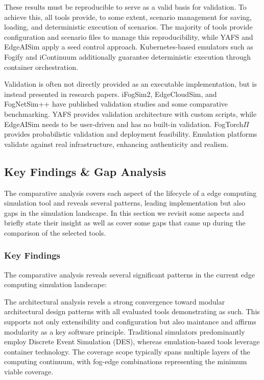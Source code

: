 These results must be reproducible to serve as a valid basis for validation.
To achieve this, all tools provide, to some extent, scenario management for saving, loading, and deterministic execution of scenarios.
The majority of tools provide configuration and scenario files to manage this reproducibility, while YAFS and EdgeAISim apply a seed control approach.
Kubernetes-based emulators such as Fogify and iContinuum additionally guarantee deterministic execution through container orchestration. 

Validation is often not directly provided as an executable implementation, but is instead presented in research papers.
iFogSim2, EdgeCloudSim, and FogNetSim++ have published validation studies and some comparative benchmarking.
YAFS provides validation architecture with custom scripts, while EdgeAISim needs to be user-driven and has no built-in validation.
FogTorch$\Pi$ provides probabilistic validation and deployment feasibility.
Emulation platforms validate against real infrastructure, enhancing authenticity and realism.

\subsection{Key Findings \& Gap Analysis}
The comparative analysis covers each aspect of the lifecycle of a edge computing simulation tool and reveals several patterns, leading implementation but also gaps in the simulation landscape.
In this section we revisit some aspects and briefly state their insight as well as cover some gaps that came up during the comparison of the selected tools.

\subsubsection{Key Findings}
The comparative analysis reveals several significant patterns in the current edge computing simulation landscape:

The architectural analysis revels a strong convergence toward modular architectural design patterns with all evaluated tools demonstrating as such.
This supports not only extensibility and configuration but also maintance and affirms modularity as a key software principle.
Traditional simulators predominantly employ Discrete Event Simulation (DES), whereas emulation-based tools leverage container technology.
The coverage scope typically spans multiple layers of the computing continuum, with fog-edge combinations representing the minimum viable coverage.

